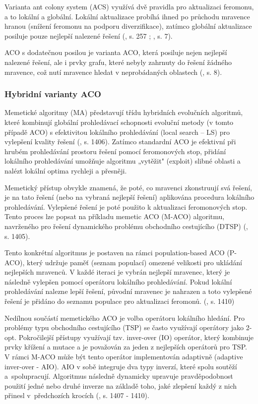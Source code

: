 \documentclass[a4paper, twoside, 12pt, czech]{article}
\begin{document}
Varianta ant colony system (ACS) využívá dvě pravidla pro aktualizaci feromonu, 
a to lokální a globální. Lokální aktualizace probíhá ihned po průchodu mravence 
hranou (snížení feromonu na podporu diverzifikace), zatímco globální aktualizace 
posiluje pouze nejlepší nalezené řešení (\cite{evolutionaryOptimizationAlgos}, s. 257 ; \cite{Fidanova2021-qg}, s. 7).

ACO s dodatečnou posilou je varianta ACO, která posiluje nejen nejlepší nalezené 
řešení, ale i prvky grafu, které nebyly zahrnuty do řešení žádného mravence, což
nutí mravence hledat v neprobádaných oblastech (\cite{Fidanova2021-qg}, s. 8).

\subsubsection{Hybridní varianty ACO}

Memetické algoritmy (MA) představují třídu hybridních evolučních algoritmů, 
které kombinují globální prohledávací schopnosti evoluční metody (v tomto přípa\-dě 
ACO) s efektivitou lokálního prohledávání (local search – LS) pro vylepšení 
kvality řešení (\cite{dynamic-aco}, s. 1406). Zatímco standardní ACO je efektivní při hrubém prohledávání 
prostoru řešení pomocí feromonových stop, přidání lokálního prohledávání umožňuje 
algoritmu „vytěžit" \space(exploit) slibné oblasti a nalézt lokální optima rychleji a 
přesněji.

Memetický přístup obvykle znamená, že poté, co mravenci zkonstruují svá řešení, 
je na tato řešení (nebo na vybraná nejlepší řešení) aplikována procedura lokálního 
prohledávání. Vylepšené řešení je poté použito k aktualizaci feromonových stop. 
Tento proces lze popsat na příkladu memetic ACO (M-ACO) algoritmu, navrženého pro řešení 
dynamického problému obchodního cestujícího (DTSP) (\cite{dynamic-aco}, s. 1405).

Tento konkrétní algoritmus je postaven na rámci population-based ACO (P-ACO), 
který udržuje paměť (seznam populací) omezené velikosti pro ukládání nejlepších 
mravenců. V každé iteraci je vybrán nejlepší mravenec, který je násled\-ně vylepšen 
pomocí operátoru lokálního prohledávání. Pokud lokální prohledá\-vání nalezne lepší řešení, původní 
mravenec je nahrazen a toto vylepšené řešení je přidáno do seznamu populace pro 
aktualizaci feromonů. (\cite{dynamic-aco}, s. 1410)

Nedílnou součástí memetického ACO je volba operátoru 
lokálního hledání. Pro problémy typu obchodního cestujícího (TSP) se často využívají 
operátory jako 2-opt. Pokročilejší přístupy využívají tzv. inver-over (IO) 
operátor, který kombinuje prvky křížení a mutace a je považován za jeden z 
nejlepších operátorů pro TSP.
V rámci M-ACO může být tento operátor implementován adaptivně (adaptive 
inver-over - AIO). AIO v sobě integruje dva typy inverzí, které spolu soutěží a~spolupracují. 
Algoritmus následně dynamicky upravuje pravděpodobnost použití 
jedné nebo druhé inverze na základě toho, jaké zlepšení každý z nich přinesl v~předchozích krocích
(\cite{dynamic-aco}, s. 1407 - 1410).
\end{document}
